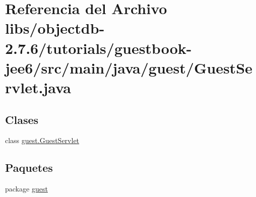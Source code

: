 \hypertarget{guestbook-jee6_2src_2main_2java_2guest_2_guest_servlet_8java}{}\section{Referencia del Archivo libs/objectdb-\/2.7.6/tutorials/guestbook-\/jee6/src/main/java/guest/\+Guest\+Servlet.java}
\label{guestbook-jee6_2src_2main_2java_2guest_2_guest_servlet_8java}
\subsection*{Clases}
\begin{DoxyCompactItemize}
\item 
class \mbox{\hyperlink{classguest_1_1_guest_servlet}{guest.\+Guest\+Servlet}}
\end{DoxyCompactItemize}
\subsection*{Paquetes}
\begin{DoxyCompactItemize}
\item 
package \mbox{\hyperlink{namespaceguest}{guest}}
\end{DoxyCompactItemize}

